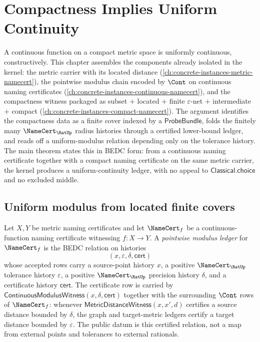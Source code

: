 \chapter{Compactness Implies Uniform Continuity}
\label{ch:concrete-instances-compact-uniform-continuity}

A continuous function on a compact metric space is uniformly continuous, constructively. This chapter assembles the components already isolated in the kernel: the metric carrier with its located distance (\autoref{ch:concrete-instances-metric-namecert}), the pointwise modulus chain encoded by $\Cont$ on continuous naming certificates (\autoref{ch:concrete-instances-continuous-namecert}), and the compactness witness packaged as subset $+$ located $+$ finite $\varepsilon$-net $+$ intermediate $+$ compact (\autoref{ch:concrete-instances-compact-namecert}). The argument identifies the compactness data as a finite cover indexed by a $\mathsf{ProbeBundle}$, folds the finitely many $\NameCert_{\RatUp}$ radius histories through a certified lower-bound ledger, and reads off a uniform-modulus relation depending only on the tolerance history. The main theorem states this in BEDC form: from a continuous naming certificate together with a compact naming certificate on the same metric carrier, the kernel produces a uniform-continuity ledger, with no appeal to $\mathsf{Classical.choice}$ and no excluded middle.

\section{Uniform modulus from located finite covers}
\label{sec:compact-uniform-continuity-uniform-modulus}

\begin{definition}
\label{def:compact-uniform-pointwise-modulus}
Let $X, Y$ be metric naming certificates and let $\NameCert_f$ be a continuous-function naming certificate witnessing $f \colon X \to Y$. A \emph{pointwise modulus ledger} for $\NameCert_f$ is the BEDC relation on histories
$$
(x,\varepsilon,\delta,\mathsf{cert})
$$
whose accepted rows carry a source-point history $x$, a positive $\NameCert_{\RatUp}$ tolerance history $\varepsilon$, a positive $\NameCert_{\RatUp}$ precision history $\delta$, and a certificate history $\mathsf{cert}$. The certificate row is carried by $\mathsf{ContinuousModulusWitness}(x,\delta,\mathsf{cert})$ together with the surrounding $\Cont$ rows of $\NameCert_f$: whenever $\mathsf{MetricDistanceWitness}(x,x',d)$ certifies a source distance bounded by $\delta$, the graph and target-metric ledgers certify a target distance bounded by $\varepsilon$. The public datum is this certified relation, not a map from external points and tolerances to external rationals.
\end{definition}

